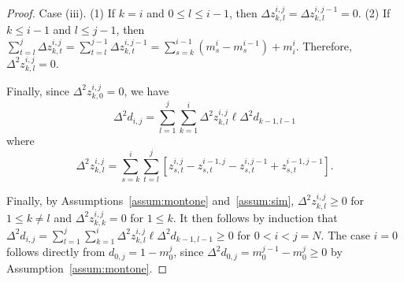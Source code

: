 \documentclass[pdflatex,sn-mathphys-num]{sn-jnl}%
\theoremstyle{thmstyleone}%
\theoremstyle{thmstyletwo}%
\theoremstyle{thmstylethree}%
\newtheorem{corollary}{Corollary}
\begin{document}
\begin{proof}


\noindent Case (iii). (1) If $k=i$ and $0\le l \le i-1$, then $\Delta z^{i,j}_{k,l}=\Delta z^{i,j-1}_{k,l}=0$. (2) If $k \le i-1$ and $l \le j-1$, then $\sum_{t=l}^{j} \Delta z^{i,j}_{k,t}=\sum_{t=l}^{j-1} \Delta z^{i,j-1}_{k,t}=\sum_{s=k}^{i-1}\left(m^{i}_s-m^{i-1}_s\right)+m^i_i$. Therefore, $\Delta^2 z^{i,j}_{k,l}=0$.

Finally, since $\Delta^2 z^{i,j}_{k,0}=0$,  we have 
\[\Delta^2 d_{i,j} = \sum_{l=1}^{j} \sum_{k=1}^{i} \Delta^2 z^{i,j}_{k,l} \ell \Delta^2 d_{k-1,l-1}\]
where
\[ \Delta^2 z^{i,j}_{k,l} = \sum_{s=k}^{i}\sum_{t=l}^{j}
\left[z^{i,j}_{s,t}-z^{i-1,j}_{s,t}-z^{i,j-1}_{s,t}+z^{i-1,j-1}_{s,t}
\right].\]

Finally, by Assumptions~\ref{assum:montone} and~\ref{assum:sim}, $\Delta^2 z^{i,j}_{k,l}\ge 0$ for $1\le k\neq l$ and $\Delta^2 z^{i,j}_{k,k}=0$ for $1\le k$. It then follows by induction that $\Delta^2 d_{i,j}=\sum_{l=1}^{j} \sum_{k=1}^{i} \Delta^2 z^{i,j}_{k,l}\ell \Delta^2 d_{k-1,l-1}\ge 0$ for $0<i<j=N$.
The case $i=0$ follows directly from $d_{0,j}=1-m_0^j$, since $\Delta^2 d_{0,j}=m_0^{j-1}-m_0^j\ge0$ by Assumption~\ref{assum:montone}.



\end{proof}
\end{document}

